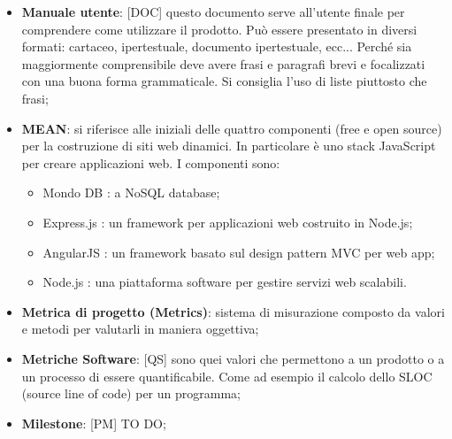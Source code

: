 \begin{itemize}


	\item \textbf{Manuale utente}: [DOC] questo documento serve all'utente finale per comprendere come utilizzare il prodotto. Può essere presentato in diversi formati: cartaceo, ipertestuale, documento ipertestuale, ecc... \newline
	Perché sia maggiormente comprensibile deve avere frasi e paragrafi brevi e focalizzati con una buona forma grammaticale. Si consiglia l'uso di liste piuttosto che frasi;

	\item \textbf{MEAN}: si riferisce alle iniziali delle quattro componenti (free e open source) per la costruzione di siti web dinamici. \newline
In particolare è uno stack JavaScript per creare applicazioni web. \newline
I componenti sono:
	\begin{itemize}
		\item Mondo DB : a NoSQL database;
		\item Express.js : un framework per applicazioni web costruito in Node.js;
		\item AngularJS : un framework basato sul design pattern MVC per web app;
		\item Node.js : una piattaforma software per gestire servizi web scalabili.
	\end{itemize}

	\item \textbf{Metrica di progetto (Metrics)}: sistema di misurazione composto da valori e metodi per valutarli in maniera oggettiva; 

	\item \textbf{Metriche Software}: [QS] sono quei valori che permettono a un prodotto o a un processo di essere quantificabile. Come ad esempio il calcolo dello SLOC (source line of code) per un programma;



	\item \textbf{Milestone}: [PM] TO DO;



\end{itemize}
